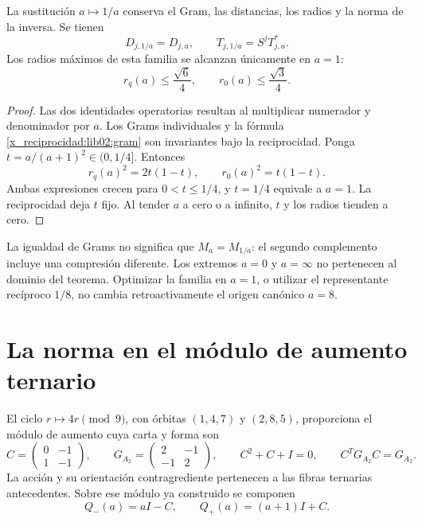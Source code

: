 \begin{proposition}
\label{x_reciprocidad:lib02:dualidad-a}
La sustitución \(a\mapsto1/a\) conserva el Gram, las distancias,
los radios y la norma de la inversa. Se tienen
\[
 D_{j,1/a}=D_{j,a},\qquad
 T_{j,1/a}=S^jT_{j,a}^*.
\]
Los radios máximos de esta familia se alcanzan únicamente en \(a=1\):
\[
 r_q(a)\leq\frac{\sqrt6}{4},\qquad
 r_0(a)\leq\frac{\sqrt3}{4}.
\]
\end{proposition}
\begin{proof}
Las dos identidades operatorias resultan al multiplicar numerador y
denominador por \(a\). Los Grams individuales y la fórmula
\eqref{x_reciprocidad:lib02:gram} son invariantes bajo la reciprocidad. Ponga
\(t=a/(a+1)^2\in(0,1/4]\). Entonces
\[
 r_q(a)^2=2t(1-t),\qquad r_0(a)^2=t(1-t).
\]
Ambas expresiones crecen para \(0<t\leq1/4\), y \(t=1/4\)
equivale a \(a=1\). La reciprocidad deja \(t\) fijo. Al tender
\(a\) a cero o a infinito, \(t\) y los radios tienden a cero.
\end{proof}

La igualdad de Grams no significa que \(M_a=M_{1/a}\): el segundo
complemento incluye una compresión diferente. Los extremos \(a=0\)
y \(a=\infty\) no pertenecen al dominio del teorema. Optimizar la
familia en \(a=1\), o utilizar el representante recíproco \(1/8\),
no cambia retroactivamente el origen canónico \(a=8\).

\section{La norma en el módulo de aumento ternario}
\label{x_reciprocidad:lib02:modulo-ternario}

El ciclo \(r\mapsto4r\pmod9\), con órbitas \((1,4,7)\) y
\((2,8,5)\), proporciona el módulo de aumento cuya carta y forma son
\[
 C=\begin{pmatrix}0&-1\\1&-1\end{pmatrix},\qquad
 G_{A_2}=\begin{pmatrix}2&-1\\-1&2\end{pmatrix},\qquad
 C^2+C+I=0,\qquad C^TG_{A_2}C=G_{A_2}.
\]
La acción y su orientación contragrediente pertenecen a las fibras
ternarias antecedentes. Sobre ese módulo ya construido se componen
\[
 Q_-(a)=aI-C,\qquad Q_+(a)=(a+1)I+C.
\]

